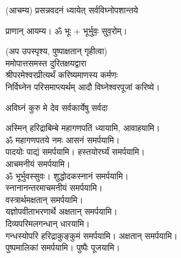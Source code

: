 
\setlength{\parindent}{0pt}


(आचम्य) 
{प्रसन्नवदनं ध्यायेत् सर्वविघ्नोपशान्तये}

प्राणान्  आयम्य।  ॐ भूः + भूर्भुवः॒ सुव॒रोम्।

(अप उपस्पृश्य, पुष्पाक्षतान् गृहीत्वा)\\
ममोपात्तसमस्त दुरितक्षयद्वारा \\
श्रीपरमेश्वरप्रीत्यर्थं करिष्यमाणस्य कर्मणः\\
निर्विघ्नेन परिसमाप्त्यर्थम् आदौ विघ्नेश्वरपूजां करिष्ये।

{अविघ्नं कुरु मे देव सर्वकार्येषु सर्वदा}

अस्मिन् हरिद्राबिम्बे महागणपतिं ध्यायामि, आवाहयामि।\\


ॐ महागणपतये नमः  आसनं समर्पयामि।\\
पादयोः पाद्यं समर्पयामि। हस्तयोरर्घ्यं समर्पयामि।\\
आचमनीयं समर्पयामि।\\
ॐ भूर्भुवस्सुवः। शुद्धोदकस्नानं समर्पयामि।\\
स्नानानन्तरमाचमनीयं समर्पयामि।\\
वस्त्रार्थमक्षतान् समर्पयामि।\\
यज्ञोपवीताभरणार्थे अक्षतान् समर्पयामि।\\
दिव्यपरिमलगन्धान् धारयामि।\\
गन्धस्योपरि हरिद्राकुङ्कुमं समर्पयामि। अक्षतान् समर्पयामि। \\
पुष्पमालिकां समर्पयामि। पुष्पैः पूजयामि।

